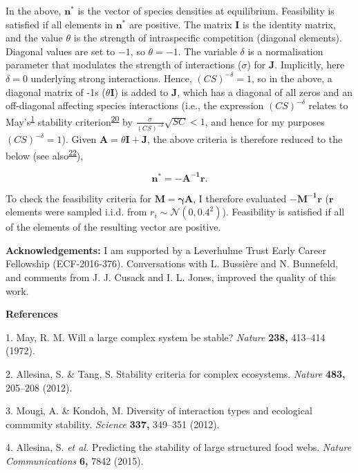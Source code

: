 \documentclass[]{article}
\begin{document}
In the above, \(\mathbf{n^{*}}\) is the vector of species densities at
equilibrium. Feasibility is satisfied if all elements in
\(\mathbf{n^{*}}\) are positive. The matrix \(\mathbf{I}\) is the
identity matrix, and the value \(\theta\) is the strength of
intraspecific competition (diagonal elements). Diagonal values are set
to \(-1\), so \(\theta = -1\). The variable \(\delta\) is a
normalisation parameter that modulates the strength of interactions
(\(\sigma\)) for \(\mathbf{J}\). Implicitly, here \(\delta = 0\)
underlying strong interactions. Hence, \((CS)^{-\delta} = 1\), so in the
above, a diagonal matrix of -1s (\(\theta \mathbf{I}\)) is added to
\(\mathbf{J}\), which has a diagonal of all zeros and an off-diagonal
affecting species interactions (i.e., the expression \((CS)^{-\delta}\)
relates to May's\textsuperscript{\protect\hyperlink{ref-May1972}{1}}
stability
criterion\textsuperscript{\protect\hyperlink{ref-Dougoud2018}{20}} by
\(\frac{\sigma}{(CS)^{-\delta}}\sqrt{SC} < 1\), and hence for my
purposes \((CS)^{-\delta} = 1\)). Given
\(\mathbf{A} = \theta\mathbf{I + J}\), the above criteria is therefore
reduced to the below (see
also\textsuperscript{\protect\hyperlink{ref-Servan2018}{22}}),

\[\mathbf{n^{*} = -A^{-1}r}.\]

To check the feasibility criteria for \(\mathbf{M = \gamma A}\), I
therefore evaluated \(\mathbf{-M^{-1}r}\) (\(\mathbf{r}\) elements were
sampled i.i.d. from \(r_{i} \sim \mathcal{N}(0, 0.4^{2})\)). Feasibility
is satisfied if all of the elements of the resulting vector are
positive.

\textbf{Acknowledgements:} I am supported by a Leverhulme Trust Early
Career Fellowship (ECF-2016-376). Conversations with L. Bussière and N.
Bunnefeld, and comments from J. J. Cusack and I. L. Jones, improved the
quality of this work.

\textbf{References}

\hypertarget{refs}{}
\hypertarget{ref-May1972}{}
1. May, R. M. Will a large complex system be stable? \emph{Nature}
\textbf{238,} 413--414 (1972).

\hypertarget{ref-Allesina2012}{}
2. Allesina, S. \& Tang, S. Stability criteria for complex ecosystems.
\emph{Nature} \textbf{483,} 205--208 (2012).

\hypertarget{ref-Mougi2012}{}
3. Mougi, A. \& Kondoh, M. Diversity of interaction types and ecological
community stability. \emph{Science} \textbf{337,} 349--351 (2012).

\hypertarget{ref-Allesina2015}{}
4. Allesina, S. \emph{et al.} Predicting the stability of large
structured food webs. \emph{Nature Communications} \textbf{6,} 7842
(2015).
\end{document}
